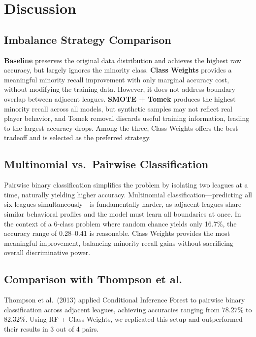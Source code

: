 \documentclass[12pt, a4paper]{article}
\begin{document}
\section{Discussion}

\subsection{Imbalance Strategy Comparison}

\textbf{Baseline} preserves the original data distribution and achieves the highest raw
accuracy, but largely ignores the minority class. \textbf{Class Weights} provides a
meaningful minority recall improvement with only marginal accuracy cost, without modifying
the training data. However, it does not address boundary overlap between adjacent leagues.
\textbf{SMOTE + Tomek} produces the highest minority recall across all models, but synthetic
samples may not reflect real player behavior, and Tomek removal discards useful training
information, leading to the largest accuracy drops. Among the three, Class Weights offers
the best tradeoff and is selected as the preferred strategy.

\subsection{Multinomial vs.\ Pairwise Classification}

Pairwise binary classification simplifies the problem by isolating two leagues at a time,
naturally yielding higher accuracy. Multinomial classification---predicting all six leagues
simultaneously---is fundamentally harder, as adjacent leagues share similar behavioral
profiles and the model must learn all boundaries at once. In the context of a 6-class
problem where random chance yields only 16.7\%, the accuracy range of 0.28--0.41 is
reasonable. Class Weights provides the most meaningful improvement, balancing minority
recall gains without sacrificing overall discriminative power.

\subsection{Comparison with Thompson et al.}

Thompson et al.\ (2013) applied Conditional Inference Forest to pairwise binary
classification across adjacent leagues, achieving accuracies ranging from 78.27\% to
82.32\%. Using RF + Class Weights, we replicated this setup and outperformed their
results in 3 out of 4 pairs.
\end{document}
